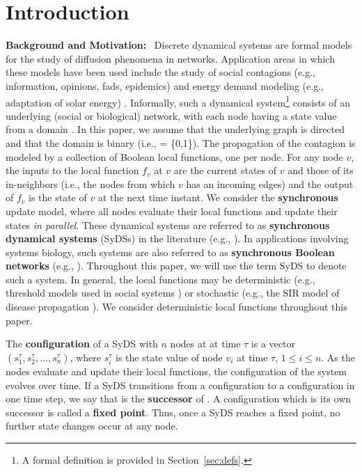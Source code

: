 \section{Introduction}
\label{sec:intro}



\smallskip

\textbf{Background and Motivation:}~
Discrete dynamical systems are formal models
for the study of diffusion phenomena in networks.
Application areas in which these models have been used
include the study of social contagions 
(e.g., information, opinions, fads, epidemics)
and energy demand modeling (e.g., adaptation of solar energy)
\cite{Adiga-etal-2019,Chistikov-etal-2020,OU-2020,Gupta-etal-2018}.
Informally, such a dynamical system\footnote{A formal definition
is provided in Section~\ref{sec:defs}.}
consists of an underlying (social or biological) network, with each node having a
state value from a domain \bbb.
In this paper, we assume that the underlying
graph is directed and that the domain is binary (i.e., \bbb{} = \{0,1\}).
The propagation of the contagion is modeled by a collection
of Boolean local functions, one per node.
For any node $v$, the inputs to the local function $f_v$ at $v$
are the current states of $v$ and those of its in-neighbors (i.e., the nodes
from which $v$ has an incoming edges) and the output of $f_v$
is the state of $v$ at the next time instant.
We consider the \textbf{synchronous} update model, where all
nodes evaluate their local functions and update their states
\emph{in parallel}.
These dynamical systems are referred to
as \textbf{synchronous dynamical systems} (SyDSs) in
the literature (e.g., \cite{Adiga-etal-2019,Rosenkrantz-etal-2018}).
In applications involving systems biology, such systems are also
referred to as \textbf{synchronous Boolean networks}
(e.g., \cite{Kauffman-etal-2003,OU-2020,Akutsu-etal-2007}).
Throughout this paper, we will use the term SyDS to denote such a system.
In general, the local functions may be deterministic (e.g., threshold models
used in social systems \cite{granovetter-1978}) or stochastic
(e.g., the SIR model of disease propagation \cite{Easley-Kleinberg-2010}).
We consider deterministic local functions throughout this paper.

The \textbf{configuration} of a SyDS with $n$ nodes at at time $\tau$ is a
vector $(s_1^{\tau}, s_2^{\tau}, \ldots, s_n^{\tau})$, where $s_i^{\tau}$
is the state value of node $v_i$ at time $\tau$, $1 \leq i \leq n$.
As the nodes evaluate and update their local functions, the configuration
of the system evolves over time.
If a SyDS transitions from a configuration \calc{} to a configuration \calcp{}
in one time step, we say that \calcp{} is the \textbf{successor} of \calc. 
A configuration \calc{} which is its own successor is called a
\textbf{fixed point}.
Thus, once a SyDS reaches a fixed point, no further state changes
occur at any node.

